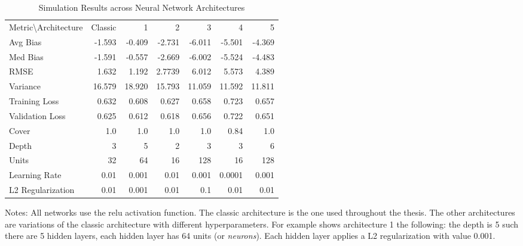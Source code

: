 \begin{table}[ht]
\centering

\begin{threeparttable}
\caption{Simulation Results across Neural Network Architectures}
\label{tab:nn}
\begin{tabular}{lrrrrrr}
    \toprule
\hline
\addlinespace
Metric\textbackslash Architecture & Classic &  1 &  2 &  3 &  4 &  5 \\
\addlinespace
\hline
\addlinespace
Avg Bias & -1.593 & -0.409 & -2.731 & -6.011 & -5.501 &-4.369 \\
Med Bias & -1.591 & -0.557 & -2.669 & -6.002 & -5.524 & -4.483\\
RMSE & 1.632 & 1.192 & 2.7739 &  6.012 &5.573 & 4.389 \\
Variance & 16.579 & 18.920 & 15.793 & 11.059 & 11.592 & 11.811 \\
Training Loss & 0.632 & 0.608 &0.627 &0.658 & 0.723 & 0.657 \\
Validation Loss & 0.625 & 0.612 &  0.618 & 0.656 & 0.722 & 0.651 \\
Cover & 1.0 & 1.0 & 1.0 & 1.0 & 0.84 & 1.0 \\
\addlinespace
\hline
\addlinespace
Depth & 3 & 5 & 2 & 3 & 3 & 6 \\
Units & 32 & 64 & 16 & 128 & 16 & 128 \\
Learning Rate & 0.01 & 0.001 & 0.01 & 0.001 & 0.0001 & 0.001 \\
L2 Regularization & 0.01 & 0.001 & 0.01 & 0.1 & 0.01 & 0.01 \\
\hline
\end{tabular}
\begin{tablenotes}
    \item Notes: All networks use the \ac{relu} activation function. The classic architecture is the one used throughout the thesis. The other architectures are variations of the classic architecture with different hyperparameters. For example shows architecture 1 the following: the depth is 5 such there are 5 hidden layers, each hidden layer has 64 units (or \textit{neurons}). Each hidden layer applies a L2 regularization with value 0.001.
\end{tablenotes}
\end{threeparttable}
\end{table}
